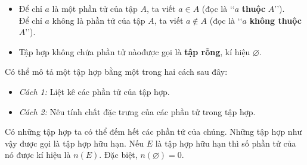 \begin{khung4}{}
	\begin{itemize}
		\item Để chỉ $a$ là một phần tử của tập $A$, ta viết $a \in A$ (đọc là \lq\lq$a$ \textbf{thuộc} $A$\rq\rq).\\ Để chỉ $a$ không là phần tử của tập $A$, ta viết $a \notin A$ (đọc là \lq\lq$a$ \textbf{không thuộc} $A$\rq\rq).
		\item Tập hợp không chứa phần tử nàođược gọi là \textbf{tập rỗng}, kí hiệu $\varnothing$.
	\end{itemize}
\end{khung4}
\begin{khung4}{}
	Có thể mô tả một tập hợp bằng một trong hai cách sau đây:
	\begin{itemize}
		\item \textit{Cách 1:} Liệt kê các phần tử của tập hợp.
		\item \textit{Cách 2:} Nêu tính chất đặc trưng của các phần tử trong tập hợp.
	\end{itemize}
\end{khung4}
\begin{note}
	Có những tập hợp ta có thể đếm hết các phần tử của chúng. Những tập hợp như vậy được gọi là tập hợp hữu hạn.
	Nếu $E$ là tập hợp hữu hạn thì số phần tử của nó được kí hiệu là $n(E)$.
	Đặc biệt, $n(\varnothing)=0$.
\end{note}
